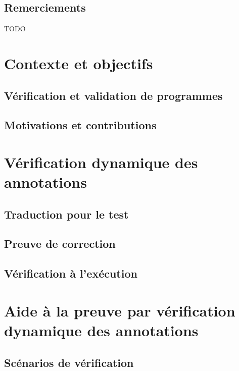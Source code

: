 \documentclass[french]{spimufcphdthesis}
\begin{document}
\chapter*{Remerciements}

TODO


\tableofcontents
\mainmatter


\part{Contexte et objectifs}


\chapter{Vérification et validation de programmes}
\label{sec:existant}



\chapter{Motivations et contributions}
\label{sec:motiv-contrib}




\part{Vérification dynamique des annotations}


\chapter{Traduction pour le test}
\label{sec:traduction}



\chapter{Preuve de correction}
\label{sec:preuve}



\chapter{Vérification à l'exécution}
\label{sec:runtime}



\part{Aide à la preuve par vérification dynamique des annotations}


\chapter{Scénarios de vérification}
\label{sec:scenarios}

\end{document}
